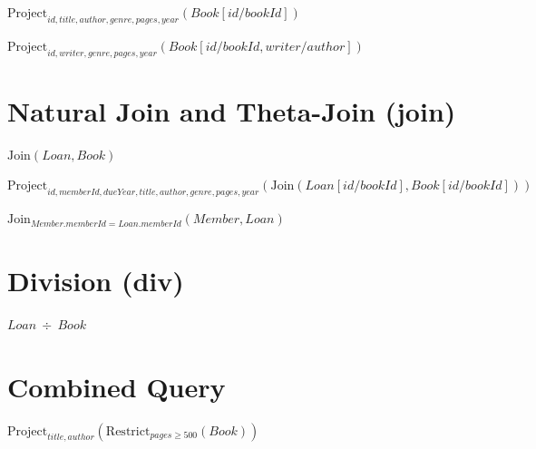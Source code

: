 \documentclass[a4paper,10pt,fleqn]{article}
\begin{document}
\noindent
$\mathrm{Project}_{id, title, author, genre, pages, year}(Book[id/bookId])$


\noindent
$\mathrm{Project}_{id, writer, genre, pages, year}(Book[id/bookId, writer/author])$


\section*{Natural Join and Theta-Join (join)}

\noindent
$\mathrm{Join}(Loan, Book)$


\noindent
$\mathrm{Project}_{id, memberId, dueYear, title, author, genre, pages, year}(\mathrm{Join}(Loan[id/bookId], Book[id/bookId]))$


\noindent
$\mathrm{Join}_{Member.memberId = Loan.memberId}(Member, Loan)$


\section*{Division (div)}

\noindent
$Loan~\div~Book$


\section*{Combined Query}

\noindent
$\mathrm{Project}_{title, author}(\mathrm{Restrict}_{pages \geq 500}(Book))$
\end{document}
